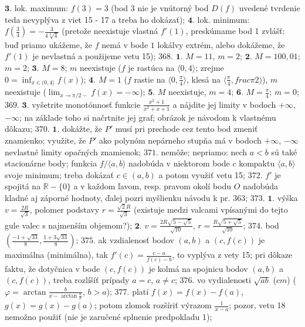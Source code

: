 $\boldsymbol{3.}$ lok. maximum: $f(3)=3$ (bod 3 nie je vnútorný bod $D(f)$ uvedené tvrdenie teda nevyplýva z viet 15 - 17 a treba ho dokázať); 
$\boldsymbol{4.}$ lok. minimum: $f(\frac{3}{4})=-\frac{3}{4\sqrt[3]{4}}$ (pretože neexistuje vlastná $f'(1)$, preskúmame bod 1 zvlášť: buď priamo ukážeme, že $f$ nemá v bode $1$ lokálvy extrém, alebo dokážeme, že $f'(1)$ je nevlastná a použijeme vetu 15);
$\boxed{368.}$ $\boldsymbol{1.}$ $M=11$, $m=2$;
$\boldsymbol{2.}$ $M=100,01$; $m=2$;
$\boldsymbol{3.}$ $M=8$; $m$ neexistuje ($f$ je rastúca na $\langle 0,4 \rangle$; zrejme $0=\inf _{x\in (0,4\rangle}f(x)$);
$\boldsymbol{4.}$  $M=1$ ($f$ rastie na  $\langle 0,\frac{\pi}{4} \rangle$, klesá na $\langle \frac{\pi}{4} ,frac{\pi}{2})$), $m$ neexistuje ($\lim_{x \to \pi/2-}f(x)=-\infty$);
$\boldsymbol{5.}$ $M$ neexistuje,  $m=4$;
$\boldsymbol{6.}$ $M=\frac{\pi}{4}$; $m=0$;
$\boxed{369.}$ $\boldsymbol{3.}$ vyšetrite monotónnosť funkcie $\frac{x^{2}+1}{x^{2}+x+1}$ a nájdite jej limity v bodoch $+\infty $, $-\infty $; na základe toho si načrtnite jej graf; obrázok je návodom k vlastnému dôkazu;
$\boxed{370.}$ $\boldsymbol{1.}$ dokážte, že $P'$ musí pri prechode cez tento bod zmeniť znamienko; využite, že $P'$ ako polynóm nepárneho stupňa má v bodoch $+\infty$, $-\infty$ nevlastné limity opačných znamienok;
$\boxed{371.}$ nemôže; nepriamo: nech $a<b$ sú také stacionárne body; funkcia $f/\langle a,b \rangle$ nadobúda v niektorom bode $c$ kompaktu $\langle a,b \rangle$ svoje minimum; treba dokázať $c\in (a,b)$ a potom využiť vetu 15;
$\boxed{372.}$ $f'$ je spojitá na $\mathbb{R}-\lbrace 0 \rbrace$ a v každom ľavom, resp. pravom okolí bodu $O$ nadobúda kladné aj záporné hodnoty, ďalej pozri myšlienku návodu k pr. 363;
$\boxed{373.}$ $\boldsymbol{1.}$ výška  $v=\frac{2R}{\sqrt{3}}$, polomer podstavy $r=\frac{\sqrt{2} R}{\sqrt{3}}$ (existuje medzi valcami vpísanými do tejto gule valec s najmenším objemom?);
$\boldsymbol{2.}$  $v=\frac{2R\sqrt{5-\sqrt{5}}}{\sqrt{10}}$,  $r=\frac{R\sqrt{5+\sqrt{5}}}{\sqrt{10}}$;
$\boxed{374.}$ bod $(\frac{-1+\sqrt{33}}{8},\frac{1+3\sqrt{33}}{8})$;
$\boxed{375.}$ ak vzdialenosť bodov $(a,b)$ a  $(c,f(c))$ je maximálna (minimálna), tak  $f'(c)=\frac{c-a}{f(c)-b}$, to vyplýva z vety 15; pri dôkaze faktu, že dotyčnica v bode $(c,f(c))$	je kolmá na spojnicu bodov $(a,b)$ a $(c,f(c))$,  treba rozlíšíť prípady $a=c$,	$a\ne c$;
$\boxed{376.}$ vo vydialenosti $\sqrt{ab}$ ($cm$) ($\varphi =\arctan \frac{b}{x-\arctan \frac{a}{x}}$, $b>a$);
$\boxed{377.}$ platí $f(x)=f(x)-f(a)$, $g(x)=g(x)-g(a)$; potom zlomok rozšíriť výrazom $\frac{1}{x-a}$; pozor, vetu 18 nemožno použiť (nie je zaručené splnenie predpokladu 1);
